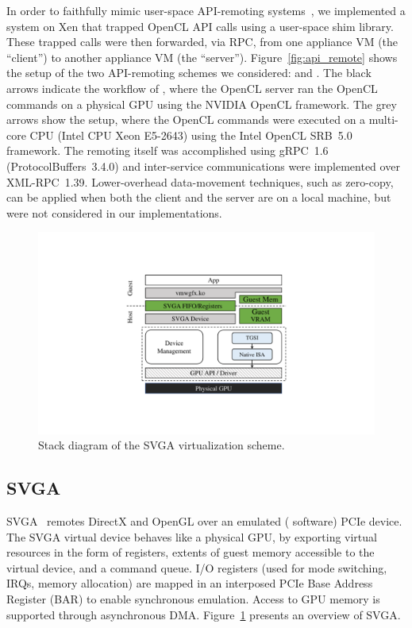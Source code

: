 In order to faithfully mimic user-space API-remoting systems~\cite{rCUDA,
kim2012snucl,bitfusion-whitepaper}, we implemented a system on Xen that trapped
OpenCL API calls using a user-space shim library. These trapped calls were
then forwarded, via RPC, from one appliance VM (the ``client'') to another
appliance VM (the ``server''). Figure~\ref{fig:api_remote} shows the setup of
the two API-remoting schemes we considered: \apigpu and \apicpu.
The black arrows indicate the workflow of \apigpu, where the OpenCL server
ran the OpenCL commands on a physical GPU using the NVIDIA OpenCL framework.
The grey arrows show the \apicpu setup, where the OpenCL commands were
executed on a multi-core CPU (Intel CPU Xeon E5-2643) using the Intel OpenCL
SRB~5.0 framework. The remoting itself was accomplished using gRPC~1.6
(ProtocolBuffers~3.4.0) and inter-service communications were implemented over
XML-RPC~1.39. Lower-overhead data-movement techniques, such as zero-copy, can
be applied when both the client and the server are on a local machine, but
were not considered in our implementations.


\begin{figure}[!th]
	\centering
	\includegraphics[width=.5\linewidth,trim={6cm 3cm 6cm 3cm},clip]{trillium/images/svga.pdf}
	\caption{{\footnotesize Stack diagram of the SVGA virtualization scheme.}}
	\label{fig_svga}
\end{figure}

\subsection{SVGA}

SVGA~\cite{dowty2009gpu} remotes DirectX and OpenGL over an emulated (
software) PCIe device. The SVGA virtual device behaves like a physical GPU, by
exporting virtual resources in the form of registers, extents of guest memory
accessible to the virtual device, and a command queue. I/O registers (used for
mode switching, IRQs, memory allocation) are mapped in an interposed PCIe Base
Address Register (BAR) to enable synchronous emulation. Access to GPU memory
is supported through asynchronous DMA. Figure~\ref{fig_svga} presents an
overview of SVGA.


